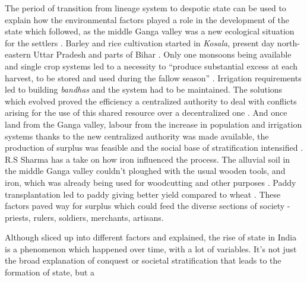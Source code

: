 \documentclass[a4paper]{article}
\begin{document}
The period of transition from lineage system to despotic state can be
used to explain how the environmental factors played a role in the
development of the state which followed, as the middle Ganga valley was
a new ecological situation for the settlers \cite[p.
72]{thapar1984lineage}. Barley and rice cultivation started in
\textit{Kosala}, present day north-eastern Uttar Pradesh and parts of
Bihar \cite[p. 73-74]{thapar1984lineage}. Only one monsoons being
available and single crop systems led to a necessity to ``produce
substantial excess at each harvest, to be stored and used during the
fallow season'' \cite[p.74]{thapar1984lineage}. Irrigation requirements
led to building \textit{bandhas} and the system had to be maintained.
The solutions which evolved proved the efficiency a centralized
authority to deal with conflicts arising for the use of this shared
resource over a decentralized one \cite[p. 75]{thapar1984lineage}. And
once land from the Ganga valley, labour from the increase in population
and irrigation systems thanks to the new centralized authority was made
available, the production of surplus was feasible and the social base of
stratification intensified \cite[p. 76]{thapar1984lineage}. R.S Sharma
has a take on how iron influenced the process. The alluvial soil in the
middle Ganga valley couldn't ploughed with the usual wooden tools, and
iron, which was already being used for woodcutting and other purposes
\cite[p. 68]{sharma1996state}. Paddy transplantation led to paddy giving
better yield compared to wheat \cite[p 68-69]{sharma1996state}. These
factors paved way for surplus which could feed the diverse sections of
society - priests, rulers, soldiers, merchants, artisans\cite[p.
69]{sharma1996state}.





Although sliced up into different factors and explained, the rise of
state in India is a phenomenon which happened over time, with a lot of
variables. It's not just the broad explanation of conquest or societal
stratification that leads to the formation of state, but a

\printbibliography 
\end{document}
